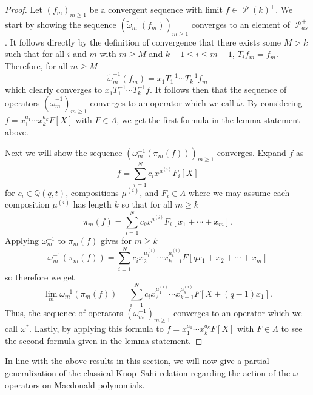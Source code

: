 \documentclass[11pt]{article}
\theoremstyle{definition}
\numberwithin{equation}{section}
\DeclareMathOperator{\sP}{\mathscr{P} }
\begin{document}
\begin{proof}
    Let $(f_m)_{m\geq 1}$ be a convergent sequence with limit $f \in \sP(k)^{+}$. We start by showing the sequence $(\widetilde{\omega}_m^{-1}(f_m))_{m \geq 1}$ converges to an element of $\sP_{as}^{+}$. It follows directly by the definition of convergence that there exists some $M >k$ such that for all $i$ and $m$ with $m \geq M$ and $k+1 \leq i \leq m-1$, $T_if_m = f_m$. Therefore, for all $m \geq M$ 
    $$\widetilde{\omega}_m^{-1}(f_m) = x_1T_1^{-1}\cdots T_{k}^{-1}f_m $$ 
    which clearly converges to $x_1T_1^{-1}\cdots T_{k}^{-1}f$. It follows then that the sequence of operators $(\widetilde{\omega}_m^{-1})_{m\geq 1}$ converges to an operator which we call $\widetilde{\omega}.$ By considering $f = x_1^{a_1}\cdots x_k^{a_k}F[X]$ with $F \in \Lambda$, we get the first formula 
    in the lemma statement above.

    Next we will show the sequence $(\omega^{-1}_m(\pi_m(f)))_{m \geq 1}$ converges.
    Expand $f$ as
    $$f = \sum_{i=1}^{N} c_ix^{\mu^{(i)}}F_i[X]$$
    for $c_i \in \mathbb{Q}(q,t)$, compositions $\mu^{(i)}$, and $F_i \in \Lambda$ where we may assume each composition $\mu^{(i)}$ has length $k$ so that for all $m \geq k$ 
    $$ \pi_m(f) = \sum_{i=1}^{N} c_i x^{\mu^{(i)}} F_i[x_1+\cdots + x_m].$$
    Applying $\omega_{m}^{-1}$ to $\pi_m(f)$ gives for $m \geq k$ 
    $$\omega_{m}^{-1}(\pi_m(f)) = \sum_{i=1}^{N} c_i x_2^{\mu^{(i)}_1}\cdots x_{k+1}^{\mu^{(i)}_k}F[qx_1+x_2+\cdots + x_m] $$
    so therefore we get 
    $$\lim_{m} \omega_{m}^{-1}(\pi_m(f)) = \sum_{i=1}^{N} c_i x_2^{\mu^{(i)}_1}\cdots x_{k+1}^{\mu^{(i)}_k}F[X+(q-1)x_1].$$
    Thus, the sequence of operators $(\omega_{m}^{-1})_{m \geq 1}$ converges to an operator which we call $\omega^{*}$. Lastly, by applying this formula to $f = x_1^{a_1}\cdots x_k^{a_k}F[X]$ with $F \in \Lambda$ to see the second formula given in the lemma statement.
\end{proof}

In line with the above results in this section, we will now give a partial generalization of the classical Knop--Sahi relation regarding the action of the $\omega$ operators on Macdonald polynomials.  
\end{document}
